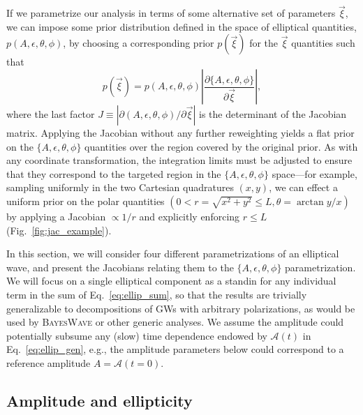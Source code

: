 \documentclass[aps,prd,twocolumn,superscriptaddress,preprintnumbers,floatfix,nofootinbib]{revtex4-2}
\begin{document}
If we parametrize our analysis in terms of some alternative set of parameters $\vec{\xi}$, we can impose some prior distribution defined in the space of elliptical quantities, $p({A, \epsilon, \theta, \phi})$, by choosing a corresponding prior $p(\vec{\xi})$ for the $\vec{\xi}$ quantities such that
\begin{equation} \label{eq:jac}
p \left( \vec{\xi} \right) = p \left( A, \epsilon, \theta, \phi \right) \left| \frac{\partial \{A, \epsilon, \theta, \phi\}}{\partial \vec{\xi}} \right| ,
\end{equation}
where the last factor $J \equiv | \partial (A, \epsilon, \theta, \phi)/\partial \vec{\xi} |$ is the determinant of the Jacobian matrix.
Applying the Jacobian without any further reweighting yields a flat prior on the  $\{A, \epsilon, \theta, \phi\}$ quantities over the region covered by the original prior.
As with any coordinate transformation, the integration limits must be adjusted to ensure that they correspond to the targeted region in the $\{A, \epsilon, \theta, \phi\}$ space---for example, sampling uniformly in the two Cartesian quadratures $(x, y)$, we can effect a uniform prior on the polar quantities $(0 < r=\sqrt{x^2+y^2} \leq L, \theta= \arctan y/x)$ by applying a Jacobian $\propto 1/r$ and explicitly enforcing $r \leq L$ (Fig.~\ref{fig:jac_example}).

In this section, we will consider four different parametrizations of an elliptical wave, and present the Jacobians relating them to the $\{A, \epsilon, \theta, \phi\}$ parametrization.
We will focus on a single elliptical component as a standin for any individual term in the sum of Eq.~\eqref{eq:ellip_sum}, so that the results are trivially generalizable to decompositions of GWs with arbitrary polarizations, as would be used by \textsc{BayesWave} or other generic analyses.
We assume the amplitude could potentially subsume any (slow) time dependence endowed by $\mathcal{A}(t)$ in Eq.~\eqref{eq:ellip_gen}, e.g., the amplitude parameters below could correspond to a reference amplitude $A=\mathcal{A}(t=0)$.

\subsection{Amplitude and ellipticity}
\label{sec:jac:Achi}
\end{document}
